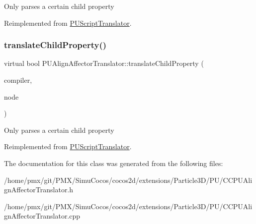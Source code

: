 Only parses a certain child property 

Reimplemented from \hyperlink{classPUScriptTranslator_a0374d83a8a04e57918975d525e0f8fe8}{P\+U\+Script\+Translator}.

\mbox{\label{classPUAlignAffectorTranslator_a5176eccdcd921162e7a1e5483f130c20}} 
\subsubsection{\texorpdfstring{translate\+Child\+Property()}{translateChildProperty()}\hspace{0.1cm}{\footnotesize\ttfamily [2/2]}}
{\footnotesize\ttfamily virtual bool P\+U\+Align\+Affector\+Translator\+::translate\+Child\+Property (\begin{DoxyParamCaption}\item[{\hyperlink{classPUScriptCompiler}{P\+U\+Script\+Compiler} $\ast$}]{compiler,  }\item[{\hyperlink{classPUAbstractNode}{P\+U\+Abstract\+Node} $\ast$}]{node }\end{DoxyParamCaption})\hspace{0.3cm}{\ttfamily [virtual]}}

Only parses a certain child property 

Reimplemented from \hyperlink{classPUScriptTranslator_a0374d83a8a04e57918975d525e0f8fe8}{P\+U\+Script\+Translator}.



The documentation for this class was generated from the following files\+:\begin{DoxyCompactItemize}
\item 
/home/pmx/git/\+P\+M\+X/\+Simu\+Cocos/cocos2d/extensions/\+Particle3\+D/\+P\+U/C\+C\+P\+U\+Align\+Affector\+Translator.\+h\item 
/home/pmx/git/\+P\+M\+X/\+Simu\+Cocos/cocos2d/extensions/\+Particle3\+D/\+P\+U/C\+C\+P\+U\+Align\+Affector\+Translator.\+cpp\end{DoxyCompactItemize}
